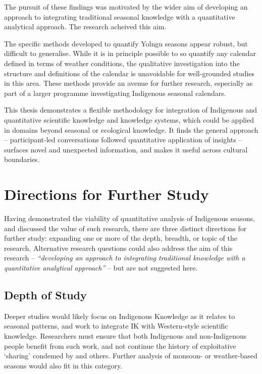 The pursuit of these findings was motivated by the wider aim of developing
an approach to integrating traditional seasonal knowledge with a quantitative
analytical approach.  The research acheived this aim.

The specific methods developed to quantify Yolngu seasons appear robust, but
difficult to generalise.  While it is in principle possible to so quantify
any calendar defined in terms of weather conditions, the qualitative
investigation into the structure and definitions of the calendar is unavoidable
for well-grounded studies in this area.  These methods provide an
avenue for further research, especially as part of a larger programme
investigating Indigenous seasonal calendars.

This thesis demonstrates a flexible methodology for integration
of Indigenous and quantitative scientific knowledge and knowledge systems,
which could be applied in domains beyond seasonal or ecological knowledge.
It finds the general approach -- participant-led conversations followed quantitative
application of insights -- surfaces novel and unexpected information, and
makes it useful across cultural boundaries.



\section{Directions for Further Study}
\label{sec:further-study}

Having demonstrated the viability of quantitative analysis of Indigenous
seasons, and discussed the value of such research, there are three distinct
directions for further study:  expanding one or more of the depth, breadth,
or topic of the research.  Alternative research questions could also address the aim
of this research -- \textit{``developing an approach to integrating traditional
knowledge with a quantitative analytical approach''} -- but are not suggested
here.

\subsection{Depth of Study}
Deeper studies would likely focus on Indigenous Knowledge as it
relates to seasonal patterns, and work to integrate IK with Western-style scientific
knowledge.  Researchers must ensure that both Indigenous and non-Indigenous
people benefit from such work, and not continue the history of exploitative
`sharing' condemed by \citet{smith1999} and others.  Further analysis of monsoon-
or weather-based seasons would also fit in this category.

